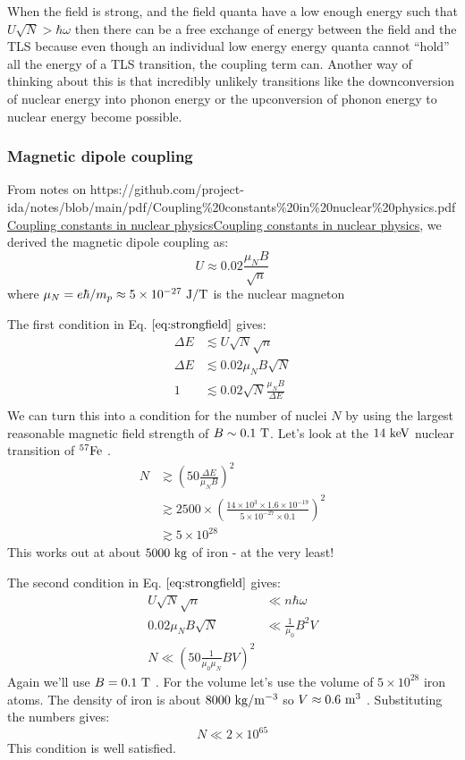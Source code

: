 \documentclass[
]{article}
\let\oldhref\href
\renewcommand{\href}[2]{\ifx#1\urlprefix\oldhref{#1}{#2}\else\uline{\oldhref{#1}{#2}}\fi}
\renewcommand{\[}{\begin{equation}}
\renewcommand{\]}{\end{equation}}
\begin{document}
When the field is strong, and the field quanta have a low enough energy
such that \(U\sqrt{N}>\hbar\omega\) then there can be a free exchange of
energy between the field and the TLS because even though an individual
low energy energy quanta cannot ``hold'' all the energy of a TLS
transition, the coupling term can. Another way of thinking about this is
that incredibly unlikely transitions like the downconversion of nuclear
energy into phonon energy or the upconversion of phonon energy to
nuclear energy become possible.

\subsubsection{Magnetic dipole coupling}\label{magnetic-dipole-coupling}

From notes on
\href{https://github.com/project-ida/notes/blob/main/pdf/Coupling\%20constants\%20in\%20nuclear\%20physics.pdf}{Coupling
constants in nuclear physics}, we derived the magnetic dipole coupling
as: \[
U \approx 0.02 \frac{{\mu_N}B}{\sqrt{n}}
\] where \(\mu_N = e\hbar/m_p \approx 5\times 10^{-27} \ \rm J/T\) is
the nuclear magneton

The first condition in Eq. \(\ref{eq:strongfield}\) gives: \[
\begin{aligned}
\Delta E &\lesssim U\sqrt{N}\sqrt{n} \\
{\Delta E} &\lesssim  0.02 \mu_N B \sqrt{N} \\
1 &\lesssim 0.02\sqrt{N}\frac{\mu_N B}{\Delta E} \\
\end{aligned}
\] We can turn this into a condition for the number of nuclei \(N\) by
using the largest reasonable magnetic field strength of
\(B\sim 0.1 \ \rm T\). Let's look at the \(\rm 14 \ keV\) nuclear
transition of \(\rm ^{57}Fe\) . \[
\begin{aligned}
N &\gtrsim \left(50\frac{\Delta E}{\mu_N B}\right)^2 \\
&\gtrsim 2500 \times \left(\frac{14 \times 10^3 \times 1.6\times 10^{-19}}{5\times 10^{-27}\times 0.1}\right)^2
\\
&\gtrsim 5 \times 10^{28}
\end{aligned}
\] This works out at about \(5000 \ \rm kg\) of iron - at the very
least!

The second condition in Eq. \(\ref{eq:strongfield}\) gives: \[
\begin{aligned}
U\sqrt{N}\sqrt{n} &\ll  n\hbar \omega \\
0.02 \mu_N B \sqrt{N} &\ll \frac{1}{\mu_0} B^2 V  \\
N \ll \left(50\frac{1}{\mu_0\mu_N}BV\right)^2
\end{aligned}
\] Again we'll use \(B=0.1 \ \rm T\) . For the volume let's use the
volume of \(5 \times 10^{28}\) iron atoms. The density of iron is about
\(8000 \ \rm kg/m^{-3}\) so \(V \approx 0.6 \ \rm m^3\) . Substituting
the numbers gives: \[
N \ll 2\times 10^{65}
\] This condition is well satisfied.
\end{document}
